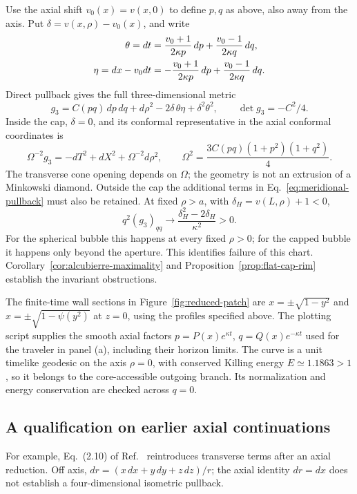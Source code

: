 Use the axial shift \(v_0(x)=v(x,0)\) to define \(p,q\) as above, also away
from the axis.  Put \(\delta=v(x,\rho)-v_0(x)\), and write
\begin{align}
  \theta=dt&=\frac{v_0+1}{2\kappa p}\,dp
                +\frac{v_0-1}{2\kappa q}\,dq,\notag\\
  \eta=dx-v_0dt&=-\frac{v_0+1}{2\kappa p}\,dp
                +\frac{v_0-1}{2\kappa q}\,dq.
  \label{eq:meridional-coframe}
\end{align}
Direct pullback gives the full three-dimensional metric
\begin{equation}
  g_3=C(pq)\,dp\,dq+d\rho^2-2\delta\,\theta\eta
                       +\delta^2\theta^2,
  \qquad \det g_3=-C^2/4.
  \label{eq:meridional-pullback}
\end{equation}
Inside the cap, \(\delta=0\), and its conformal representative in the
axial conformal coordinates is
\begin{equation}
  \Omega^{-2}g_3=-dT^2+dX^2+\Omega^{-2}d\rho^2,
  \qquad \Omega^2=\frac{3C(pq)(1+p^2)(1+q^2)}4.
  \label{eq:meridional-conformal-metric}
\end{equation}
The transverse cone opening depends on \(\Omega\); the geometry is not an
extrusion of a Minkowski diamond.  Outside the cap the additional terms in
Eq.~\eqref{eq:meridional-pullback} must also be retained.  At fixed
\(\rho>a\), with \(\delta_H=v(L,\rho)+1<0\),
\[
  q^2(g_3)_{qq}\longrightarrow
  \frac{\delta_H^2-2\delta_H}{\kappa^2}>0.
\]
For the spherical bubble this happens at every fixed \(\rho>0\); for the
capped bubble it happens only beyond the aperture.  This identifies failure
of this chart.  Corollary~\ref{cor:alcubierre-maximality} and
Proposition~\ref{prop:flat-cap-rim} establish the invariant obstructions.

The finite-time wall sections in Figure~\ref{fig:reduced-patch} are
\(x=\pm\sqrt{1-y^2}\) and \(x=\pm\sqrt{1-\psi(y^2)}\) at \(z=0\),
using the profiles specified above.  The plotting script supplies the
smooth axial factors \(p=P(x)e^{\kappa t}\),
\(q=Q(x)e^{-\kappa t}\) used for the traveler in panel (a), including their
horizon limits.  The curve is a unit timelike geodesic on the axis \(\rho=0\),
with conserved Killing energy \(E\simeq1.1863>1\), so it belongs to the
core-accessible outgoing branch.  Its normalization and energy conservation
are checked across \(q=0\).


\subsection*{A qualification on earlier axial continuations}
For example, Eq.~(2.10) of Ref.~\cite{GonzalezDiaz2000}
reintroduces transverse terms after an axial reduction.  Off axis,
\(dr=(x\,dx+y\,dy+z\,dz)/r\); the axial identity \(dr=dx\) does not
establish a four-dimensional isometric pullback.
